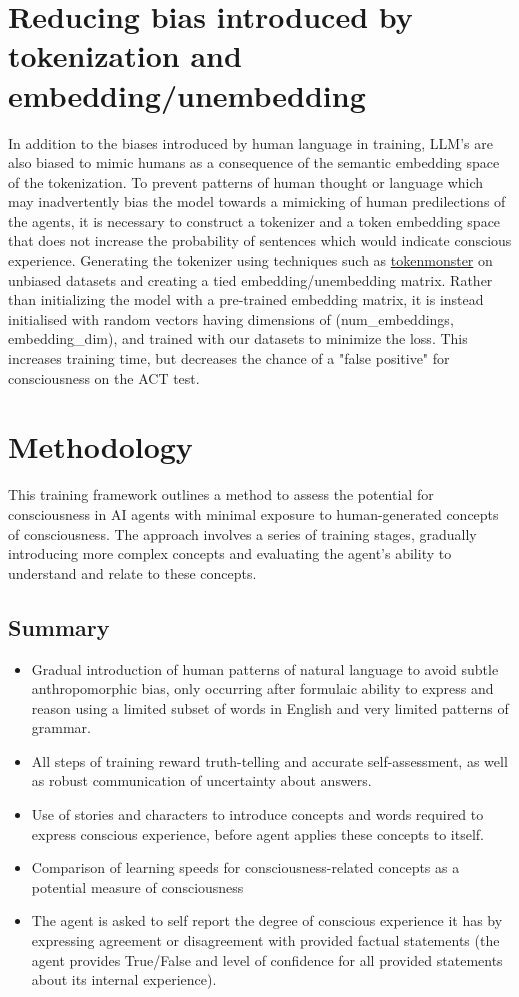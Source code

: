 \documentclass{article}
\begin{document}
\section{Reducing bias introduced by tokenization and embedding/unembedding}
In addition to the biases introduced by human language in training, LLM's are also biased to mimic humans as a consequence of the semantic embedding space of the tokenization. To prevent patterns of human thought or language which may inadvertently bias the model towards a mimicking of human predilections of the  agents, it is necessary to construct a tokenizer and a token embedding space that does not increase the probability of sentences which would indicate conscious experience. Generating the tokenizer using techniques such as \href{https://github.com/alasdairforsythe/tokenmonster}{tokenmonster} on unbiased datasets and creating a tied embedding/unembedding matrix. Rather than initializing the model with a pre-trained embedding matrix, it is instead initialised with random vectors having dimensions of (num\_embeddings, embedding\_dim), and trained with our datasets to minimize the loss. This increases training time, but decreases the chance of a "false positive" for consciousness on the ACT test. 


\section{Methodology}
This training framework outlines a method to assess the potential for consciousness in AI agents with minimal exposure to human-generated concepts of consciousness. The approach involves a series of training stages, gradually introducing more complex concepts and evaluating the agent's ability to understand and relate to these concepts.

\subsection{Summary}
\begin{itemize}
    \item Gradual introduction of human patterns of natural language to avoid subtle anthropomorphic bias, only occurring after formulaic ability to express and reason using a limited subset of words in English and very limited patterns of grammar.
    \item All steps of training reward truth-telling and accurate self-assessment, as well as robust communication of uncertainty about answers.
    \item Use of stories and characters to introduce concepts and words required to express conscious experience, before agent applies these concepts to itself.
    \item Comparison of learning speeds for consciousness-related concepts as a potential measure of consciousness
    \item The agent is asked to self report the degree of conscious experience it has by expressing agreement or disagreement with provided factual statements (the agent provides True/False and level of confidence for all provided statements about its internal experience).
\end{itemize}
\end{document}
